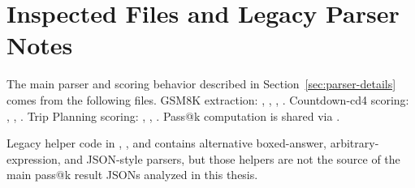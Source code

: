 \section{Inspected Files and Legacy Parser Notes}
\label{sec:appendix-inspected-files}
The main parser and scoring behavior described in Section~\ref{sec:parser-details} comes from the following files. GSM8K extraction: \texttt{}, \texttt{}, \texttt{}, \texttt{}. Countdown-cd4 scoring: \texttt{}, \texttt{}, \texttt{}. Trip Planning scoring: \texttt{}, \texttt{}, \texttt{}. Pass@k computation is shared via \texttt{}.

Legacy helper code in \texttt{}, \texttt{}, and \texttt{} contains alternative boxed-answer, arbitrary-expression, and JSON-style parsers, but those helpers are not the source of the main pass@k result JSONs analyzed in this thesis.

